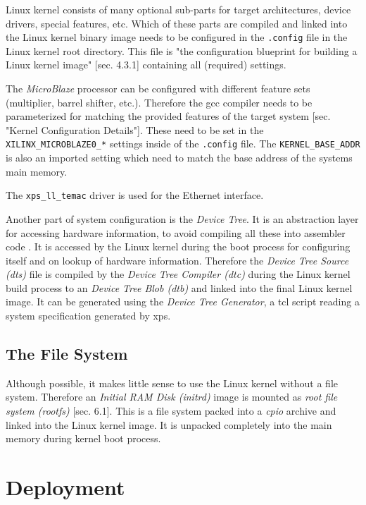 Linux kernel consists of many optional sub-parts for target architectures, device drivers, special features, etc. Which of these parts are compiled and linked into the Linux kernel binary image needs to be configured in the \texttt{.config} file in the Linux kernel root directory. This file is "the configuration blueprint for building a Linux kernel image" \cite{linuxPrimer}[sec. 4.3.1] containing all (required) settings.

The \textit{MicroBlaze} processor can be configured with different feature sets (multiplier, barrel shifter, etc.). Therefore the \gls{gcc} compiler needs to be parameterized for matching the provided features of the target system \cite{mb_linux}[sec. "Kernel Configuration Details"]. These need to be set in the \texttt{XILINX\_MICROBLAZE0\_*} settings inside of the \texttt{.config} file. The \texttt{KERNEL\_BASE\_ADDR} is also an imported setting which need to match the base address of the systems main memory.

The \texttt{xps\_ll\_temac} driver is used for the Ethernet interface.

Another part of system configuration is the \textit{Device Tree}. It is an abstraction layer for accessing hardware information, to avoid compiling all these into assembler code \cite{device_tree}. It is accessed by the Linux kernel during the boot process for configuring itself and on lookup of hardware information. Therefore the \textit{Device Tree Source (dts)} file is compiled by the \textit{Device Tree Compiler (dtc)} during the Linux kernel build process to an \textit{Device Tree Blob (dtb)} and linked into the final Linux kernel image. It can be generated using the \textit{Device Tree Generator}, a \gls{tcl} script reading a system specification generated by \gls{xps}.

\subsection{The File System}
\label{subsec:fs}

Although possible, it makes little sense to use the Linux kernel without a file system. Therefore an \textit{Initial RAM Disk (initrd)} image is mounted as \textit{root file system (rootfs)} \cite{linuxPrimer}[sec. 6.1]. This is a file system packed into a \textit{cpio} archive and linked into the Linux kernel image. It is unpacked completely into the main memory during kernel boot process.

\section{Deployment}

